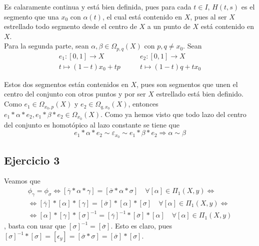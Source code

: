 \documentclass{article}
\begin{document}
Es calaramente continua y está bien definida, pues para cada $t\in I$, $H(t,s)$ es el segmento que una $x_0$ con $\alpha(t)$, el cual está contenido en $X$, pues al ser $X$ estrellado todo segmento desde el centro de $X$ a un punto de $X$ está contenido en $X$.\\

Para la segunda parte, sean $\alpha, \beta\in \Omega_{p,q}(X)$ con $p,q\neq x_0$. Sean 
\begin{equation*}
\left.\begin{array}{c}
e_1:[0,1]\rightarrow X\\
t\mapsto (1-t)x_0+tp
\end{array} \right.\qquad
\left.\begin{array}{c}
e_2:[0,1]\rightarrow X\\
t\mapsto (1-t)q+tx_0
\end{array} \right.
\end{equation*}

Estos dos segmentos están contenidos en $X$, pues son segmentos que unen el centro del conjunto con otros puntos y por ser $X$ estrellado está bien definido. Como $e_1\in \Omega_{x_0,p}(X)$ y $e_2\in \Omega_{q,x_0}(X)$, entonces $e_1*\alpha*e_2,e_1*\beta*e_2\in \Omega_{x_0}(X)$. Como ya hemos visto que todo lazo del centro del conjunto es homotópico al lazo constante se tiene que
\begin{equation*}
e_1*\alpha*e_2\sim \varepsilon_{x_0}\sim e_1*\beta*e_2\Rightarrow \alpha\sim \beta
\end{equation*}

\subsection{Ejercicio 3}
Veamos que 
\begin{gather*}
\phi_\gamma =\phi_\sigma\Leftrightarrow [\overline{\gamma}*\alpha*\gamma]=[\overline{\sigma}*\alpha*\sigma]\quad \forall [\alpha]\in \Pi_1(X,y) \Leftrightarrow\\
\Leftrightarrow [\overline{\gamma}]*[\alpha]*[\gamma]=[\overline{\sigma}]*[\alpha]*[\sigma] \quad \forall [\alpha] \in \Pi_1(X,y)\Leftrightarrow \\
\Leftrightarrow [\alpha]*[\gamma]*[\sigma]^{-1}=[\overline{\gamma}]^{-1}*[\overline{\sigma}]*[\alpha] \quad \forall [\alpha]\in \Pi_1(X,y)
\end{gather*}
, basta con usar que $[\sigma]^{-1}=[\overline{\sigma}]$. Esto es claro, pues $[\sigma]^{-1}*[\sigma]=[\epsilon_y]=[\overline{\sigma}*\sigma]=[\overline{\sigma}]*[\sigma]$.
\end{document}
